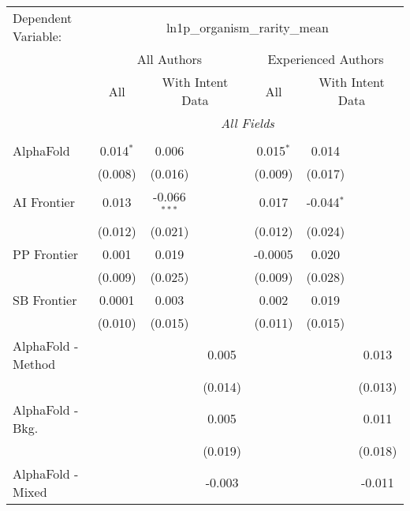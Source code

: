 \begingroup
\centering
\begin{tabular}{lcccccc}
   \tabularnewline \midrule \midrule
   Dependent Variable: & \multicolumn{6}{c}{ln1p\_organism\_rarity\_mean}\\
 & \multicolumn{3}{c}{All Authors} & \multicolumn{3}{c}{Experienced Authors} \\
\cmidrule(lr){2-4} \cmidrule(lr){5-7}
 & \multicolumn{1}{c}{All} & \multicolumn{2}{c}{With Intent Data} & \multicolumn{1}{c}{All} & \multicolumn{2}{c}{With Intent Data} \\
\cmidrule(lr){2-2} \cmidrule(lr){3-4} \cmidrule(lr){5-5} \cmidrule(lr){6-7}
 & \multicolumn{6}{c}{\textit{All Fields}} \\ \\
   AlphaFold            & 0.014$^{*}$ & 0.006          &         & 0.015$^{*}$ & 0.014        &   \\   
                        & (0.008)     & (0.016)        &         & (0.009)     & (0.017)      &   \\   
   AI Frontier          & 0.013       & -0.066$^{***}$ &         & 0.017       & -0.044$^{*}$ &   \\   
                        & (0.012)     & (0.021)        &         & (0.012)     & (0.024)      &   \\   
   PP Frontier          & 0.001       & 0.019          &         & -0.0005     & 0.020        &   \\   
                        & (0.009)     & (0.025)        &         & (0.009)     & (0.028)      &   \\   
   SB Frontier          & 0.0001      & 0.003          &         & 0.002       & 0.019        &   \\   
                        & (0.010)     & (0.015)        &         & (0.011)     & (0.015)      &   \\   
   AlphaFold - Method   &             &                & 0.005   &             &              & 0.013\\   
                        &             &                & (0.014) &             &              & (0.013)\\   
   AlphaFold - Bkg.     &             &                & 0.005   &             &              & 0.011\\   
                        &             &                & (0.019) &             &              & (0.018)\\   
   AlphaFold - Mixed    &             &                & -0.003  &             &              & -0.011\\   

\end{tabular}
